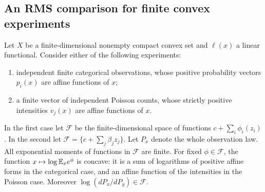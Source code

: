 \subsection{An RMS comparison for finite convex experiments}
Let $X$ be a finite-dimensional nonempty compact convex set and $\ell(x)$
a linear functional. Consider either of the following experiments:
\begin{enumerate}
\item independent finite categorical observations, whose positive probability
vectors $p_i(x)$ are affine functions of $x$;
\item a finite vector of independent Poisson counts, whose strictly positive
intensities $v_j(x)$ are affine functions of $x$.
\end{enumerate}
In the first case let $\mathcal F$ be the finite-dimensional space of
functions $c+\sum_i\phi_i(z_i)$. In the second let
$\mathcal F=\{c+\sum_j\beta_j z_j\}$. Let $P_x$ denote the whole
observation law. All exponential moments of functions in $\mathcal F$
are finite. For fixed $\phi\in\mathcal F$, the function
$x\mapsto\log\mathbb E_xe^\phi$ is concave: it is a sum of logarithms of positive
affine forms in the categorical case, and an affine function of the
intensities in the Poisson case. Moreover $\log(dP_x/dP_y)\in\mathcal F$.

